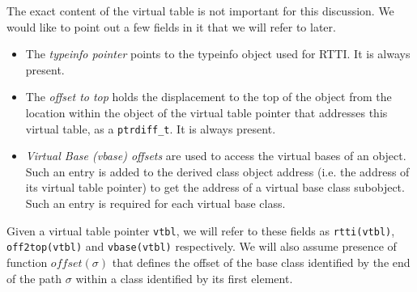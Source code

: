 \documentclass[preprint]{sigplanconf}
\makeatletter
\DeclareRobustCommand{\code}[1]{{\lstinline[breaklines=false,escapechar=@]{#1}}}
\makeatother
\begin{document}


The exact content of the virtual table is not important for this discussion. We 
would like to point out a few fields in it that we will refer to later.

\begin{itemize}
\setlength{\itemsep}{0pt}
\setlength{\parskip}{0pt}
\item The \emph{typeinfo pointer} points to the typeinfo object used for RTTI. 
      It is always present.  
\item The \emph{offset to top} holds the displacement to the top of the object 
      from the location within the object of the virtual table pointer that 
      addresses this virtual table, as a \code{ptrdiff_t}. It is always present.
\item \emph{Virtual Base (vbase) offsets} are used to access the virtual bases 
      of an object. Such an entry is added to the derived class object address 
      (i.e. the address of its virtual table pointer) to get the address of a 
      virtual base class subobject. Such an entry is required for each virtual 
      base class.
\end{itemize}

\noindent
Given a virtual table pointer \code{vtbl}, we will refer to these fields as 
\code{rtti(vtbl)}, \code{off2top(vtbl)} and \code{vbase(vtbl)} respectively. 
We will also assume presence of function $offset(\sigma)$ that defines the 
offset of the base class identified by the end of the path $\sigma$ within a 
class identified by its first element.
\end{document}
